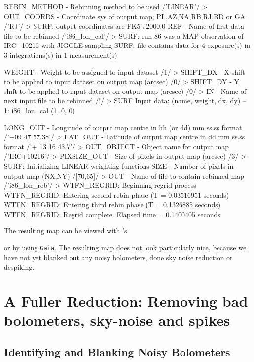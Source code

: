 \documentclass[twoside,11pt,noabs]{starlink}
\providecommand{\Kappa}{\xref{\textsc{Kappa}}{sun95}{}}
\providecommand{\task}[1]{\textsf{#1}}
\providecommand{\display}{\xref{\task{display}}{sun95}{DISPLAY}}
\begin{document}
\begin{small}
\begin{terminalv}
REBIN_METHOD - Rebinning method to be used /'LINEAR'/ >
OUT_COORDS - Coordinate sys of output map; PL,AZ,NA,RB,RJ,RD or GA
/'RJ'/ >
SURF: output coordinates are FK5 J2000.0
REF - Name of first data file to be rebinned /'i86_lon_cal'/ >
SURF: run 86 was a MAP observation of IRC+10216 with JIGGLE sampling
SURF: file contains data for 4 exposure(s) in 3 integrations(s) in 1
measurement(s)

WEIGHT - Weight to be assigned to input dataset /1/ >
SHIFT_DX - X shift to be applied to input dataset on output map
(arcsec) /0/ >
SHIFT_DY - Y shift to be applied to input dataset on output map
(arcsec) /0/ >
IN - Name of next input file to be rebinned /!/ >
SURF Input data: (name, weight, dx, dy)
   -- 1: i86_lon_cal (1, 0, 0)

LONG_OUT - Longitude of output map centre in hh (or dd) mm ss.ss
format
/'+09 47 57.38'/ >
LAT_OUT - Latitude of output map centre in dd mm ss.ss format /'+ 13
16 43.7'/ >
OUT_OBJECT - Object name for output map /'IRC+10216'/ >
PIXSIZE_OUT - Size of pixels in output map (arcsec) /3/ >
SURF: Initializing LINEAR weighting functions
SIZE - Number of pixels in output map (NX,NY) /[70,65]/ >
OUT - Name of file to contain rebinned map /'i86_lon_reb'/ >
WTFN_REGRID: Beginning regrid process
WTFN_REGRID: Entering second rebin phase (T = 0.03516951 seconds)
WTFN_REGRID: Entering third rebin phase (T = 0.1326885 seconds)
WTFN_REGRID: Regrid complete. Elapsed time = 0.1400405 seconds
\end{terminalv}
\end{small}

The resulting map can be viewed with \Kappa's \display

\begin{terminalv}
\end{terminalv}

or by using \texttt{Gaia}.  The resulting map does not look
particularly nice, because we have not yet blanked out any noisy
bolometers, done sky noise reduction or despiking.



\section{A Fuller Reduction: Removing bad
bolometers, sky-noise and spikes}
\subsection{Identifying and Blanking Noisy
Bolometers}
\end{document}
